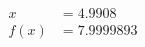 \documentclass[preview]{standalone}
\begin{document}
\begin{align*}
x &= 4.9908\\f(x) &= 7.9999893
\end{align*}
\end{document}
